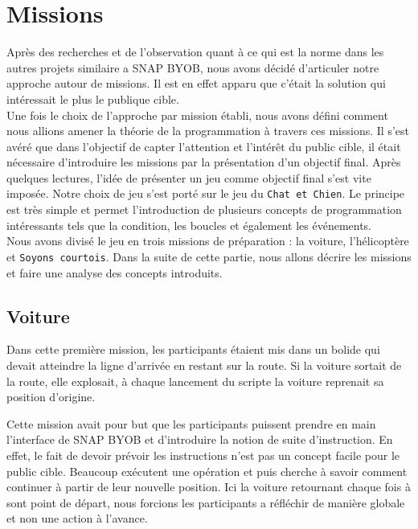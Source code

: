 \section{Missions}
\label{missions}
Après des recherches et de l'observation quant à ce qui est la norme dans les autres projets similaire a SNAP BYOB, nous avons décidé d'articuler notre approche autour de missions. Il est en effet apparu que c'était la solution qui intéressait le plus le publique cible.\\

Une fois le choix de l'approche par mission établi, nous avons défini comment nous allions amener la théorie de la programmation à travers ces missions. Il s'est avéré que dans l'objectif de capter l'attention et l'intérêt du public cible, il était nécessaire d'introduire les missions par la présentation d'un objectif final. Après quelques lectures, l'idée de présenter un jeu comme objectif final s'est vite imposée. Notre choix de jeu s'est porté sur le jeu du \texttt{Chat et Chien}. Le principe est très simple et permet l'introduction de plusieurs concepts de programmation intéressants tels que la condition, les boucles et également les événements.\\

Nous avons divisé le jeu en trois missions de préparation : la voiture, l'hélicoptère et \texttt{Soyons courtois}. Dans la suite de cette partie, nous allons décrire les missions et faire une analyse des concepts introduits.

\subsection{Voiture}
Dans cette première mission, les participants étaient mis dans un bolide qui devait atteindre la ligne d'arrivée en restant sur la route. Si la voiture sortait de la route, elle explosait, à chaque lancement du scripte la voiture reprenait sa position d'origine.

Cette mission avait pour but que les participants puissent prendre en main l'interface de SNAP BYOB et d'introduire la notion de suite d'instruction. En effet, le fait de devoir prévoir les instructions n'est pas un concept facile pour le public cible. Beaucoup exécutent une opération et puis cherche à savoir comment continuer à partir de leur nouvelle position. Ici la voiture retournant chaque fois à sont point de départ, nous forcions les participants a réfléchir de manière globale et non une action à l'avance.

